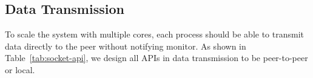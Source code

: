 




\subsection{Data Transmission}
\label{subsec:data_trans}

To scale the system with multiple cores, each process should be able to transmit data directly to the peer without notifying monitor. As shown in Table~\ref{tab:socket-api}, we design all APIs in data transmission to be peer-to-peer or local.

